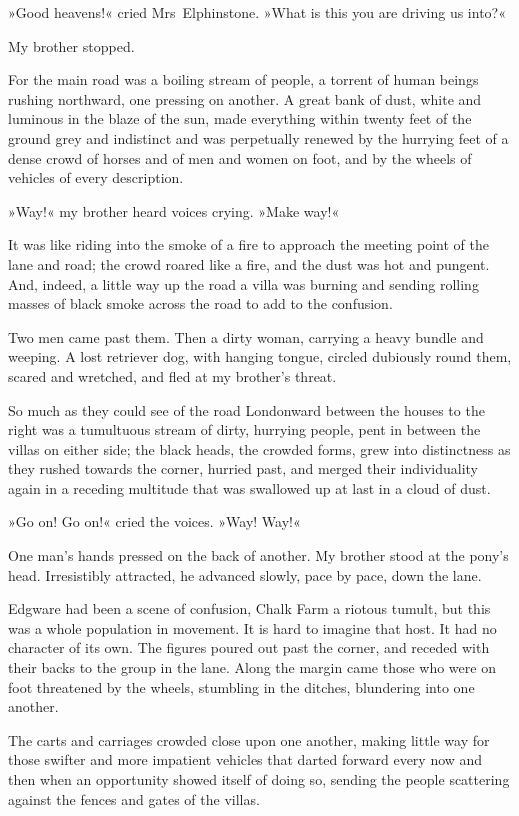 »Good heavens!« cried Mrs~Elphinstone. »What is this you are driving us into?«

My brother stopped.

For the main road was a boiling stream of people, a torrent of human beings rushing northward, one pressing on another. A great bank of dust, white and luminous in the blaze of the sun, made everything within twenty feet of the ground grey and indistinct and was perpetually renewed by the hurrying feet of a dense crowd of horses and of men and women on foot, and by the wheels of vehicles of every description.

»Way!« my brother heard voices crying. »Make way!«

It was like riding into the smoke of a fire to approach the meeting point of the lane and road; the crowd roared like a fire, and the dust was hot and pungent. And, indeed, a little way up the road a villa was burning and sending rolling masses of black smoke across the road to add to the confusion.

Two men came past them. Then a dirty woman, carrying a heavy bundle and weeping. A lost retriever dog, with hanging tongue, circled dubiously round them, scared and wretched, and fled at my brother's threat.

So much as they could see of the road Londonward between the houses to the right was a tumultuous stream of dirty, hurrying people, pent in between the villas on either side; the black heads, the crowded forms, grew into distinctness as they rushed towards the corner, hurried past, and merged their individuality again in a receding multitude that was swallowed up at last in a cloud of dust.

»Go on! Go on!« cried the voices. »Way! Way!«

One man's hands pressed on the back of another. My brother stood at the pony's head. Irresistibly attracted, he advanced slowly, pace by pace, down the lane.

Edgware had been a scene of confusion, Chalk Farm a riotous tumult, but this was a whole population in movement. It is hard to imagine that host. It had no character of its own. The figures poured out past the corner, and receded with their backs to the group in the lane. Along the margin came those who were on foot threatened by the wheels, stumbling in the ditches, blundering into one another.

The carts and carriages crowded close upon one another, making little way for those swifter and more impatient vehicles that darted forward every now and then when an opportunity showed itself of doing so, sending the people scattering against the fences and gates of the villas.

